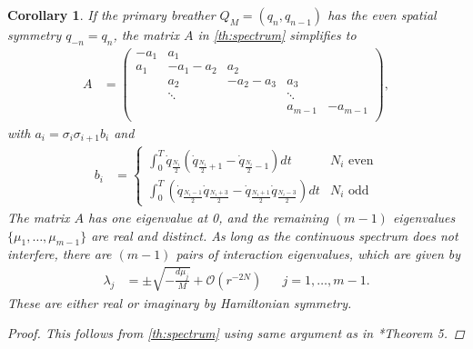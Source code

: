 \documentclass[12pt,reqno]{amsart}
\newtheorem{corollary}{Corollary}
\theoremstyle{definition}
\begin{document}
\begin{corollary}\label{corr:even}
If the primary breather $Q_M = (q_n, q_{n-1})$ has the even spatial symmetry $q_{-n} = q_n$, the matrix $A$ in \cref{th:spectrum} simplifies to
\begin{align}\label{eq:matrixAsymm}
A &= \begin{pmatrix}
-a_1 & a_1 & & & \\
a_1 & -a_1 - a_2 & a_2 \\
& a_2 & -a_2 - a_3 & a_3 \\
& \ddots & & \ddots \\
& & & a_{m-1} & -a_{m-1}  \\
\end{pmatrix},
\end{align}
with $a_i = \sigma_i \sigma_{i+1} b_i$ and
\begin{align*}
b_i &= \begin{cases}
\int_0^T \dot{q}_{\frac{N_i}{2}}\left( \dot{q}_{\frac{N_i}{2}+1} - \dot{q}_{\frac{N_i}{2}-1}\right) dt & N_i \text{ even} \\
\int_0^T \left( \dot{q}_{\frac{N_i-1}{2}}\dot{q}_{\frac{N_i+3}{2}} - \dot{q}_{\frac{N_i+1}{2}}\dot{q}_{\frac{N_i-3}{2}} \right) dt & N_i \text{ odd}
\end{cases}
\end{align*}
The matrix $A$ has one eigenvalue at 0, and the remaining $(m-1)$ eigenvalues $\{\mu_1, \dots, \mu_{m-1}\}$ are real and distinct. As long as the continuous spectrum does not interfere, there are $(m-1)$ pairs of interaction eigenvalues, which are given by 
\begin{align}\label{eq:inteigs}
\lambda_j &= \pm \sqrt{-\frac{d \mu_j}{M}} + \mathcal{O}(r^{-2N}) && j = 1, \dots, m-1.
\end{align}
These are either real or imaginary by Hamiltonian symmetry.
\begin{proof}
This follows from \cref{th:spectrum} using same argument as in \cite{Parker2020}*{Theorem 5}.
\end{proof}
\end{corollary}
\end{document}
